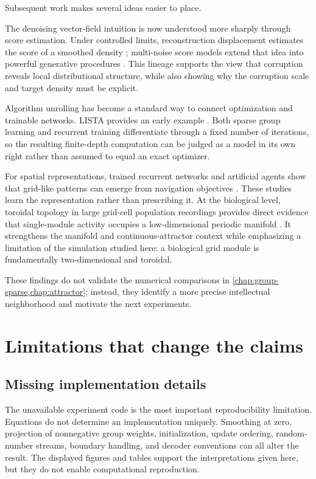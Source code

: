 Subsequent work makes several ideas easier to place.

The denoising vector-field intuition is now understood more sharply through score estimation. Under controlled limits, reconstruction displacement estimates the score of a smoothed density \citep{alain14}; multi-noise score models extend that idea into powerful generative procedures \citep{song19}. This lineage supports the view that corruption reveals local distributional structure, while also showing why the corruption scale and target density must be explicit.

Algorithm unrolling has become a standard way to connect optimization and trainable networks. LISTA provides an early example \citep{gregor10}. Both sparse group learning and recurrent training differentiate through a fixed number of iterations, so the resulting finite-depth computation can be judged as a model in its own right rather than assumed to equal an exact optimizer.

For spatial representations, trained recurrent networks and artificial agents show that grid-like patterns can emerge from navigation objectives \citep{cueva18,banino18}. These studies learn the representation rather than prescribing it. At the biological level, toroidal topology in large grid-cell population recordings provides direct evidence that single-module activity occupies a low-dimensional periodic manifold \citep{gardner22}. It strengthens the manifold and continuous-attractor context while emphasizing a limitation of the simulation studied here: a biological grid module is fundamentally two-dimensional and toroidal.

These findings do not validate the numerical comparisons in \cref{chap:group-sparse,chap:attractor}; instead, they identify a more precise intellectual neighborhood and motivate the next experiments.

\section{Limitations that change the claims}
\label{sec:synthesis-limitations}

\subsection{Missing implementation details}

The unavailable experiment code is the most important reproducibility limitation. Equations do not determine an implementation uniquely. Smoothing at zero, projection of nonnegative group weights, initialization, update ordering, random-number streams, boundary handling, and decoder conventions can all alter the result. The displayed figures and tables support the interpretations given here, but they do not enable computational reproduction.

